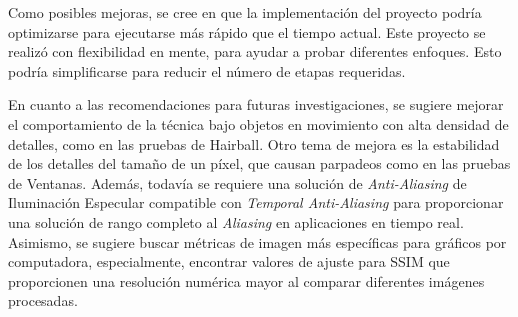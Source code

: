 \documentclass[pregrado]{tesis-usb} %
\begin{document}
Como posibles mejoras, se cree en que la implementación del proyecto podría optimizarse para ejecutarse más rápido que el tiempo actual. Este proyecto se realizó con flexibilidad en mente, para ayudar a probar diferentes enfoques. Esto podría simplificarse para reducir el número de etapas requeridas.

En cuanto a las recomendaciones para futuras investigaciones, se sugiere mejorar el comportamiento de la técnica bajo objetos en movimiento con alta densidad de detalles, como en las pruebas de Hairball. Otro tema de mejora es la estabilidad de los detalles del tamaño de un píxel, que causan parpadeos como en las pruebas de Ventanas. Además, todavía se requiere una solución de \textit{Anti-Aliasing} de Iluminación Especular compatible con \textit{Temporal Anti-Aliasing} para proporcionar una solución de rango completo al \textit{Aliasing} en aplicaciones en tiempo real. Asimismo, se sugiere buscar métricas de imagen más específicas para gráficos por computadora, especialmente, encontrar valores de ajuste para SSIM que proporcionen una resolución numérica mayor al comparar diferentes imágenes procesadas.




\appendix
\end{document}
